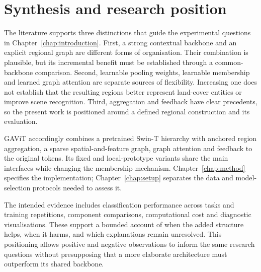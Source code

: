 \section{Synthesis and research position}

The literature supports three distinctions that guide the experimental
questions in Chapter~\ref{chap:introduction}. First, a strong contextual
backbone and an explicit regional graph are different forms of organisation.
Their combination is plausible, but its incremental benefit must be
established through a common-backbone comparison. Second, learnable pooling
weights, learnable membership and learned graph attention are separate
sources of flexibility. Increasing one does not establish that the resulting
regions better represent land-cover entities or improve scene recognition.
Third, aggregation and feedback have clear precedents, so the present work
is positioned around a defined regional construction and its evaluation.

GAViT accordingly combines a pretrained Swin-T hierarchy with anchored region
aggregation, a sparse spatial-and-feature graph, graph attention and feedback
to the original tokens. Its fixed and local-prototype variants share the
main interfaces while changing the membership mechanism. Chapter~\ref{chap:method}
specifies the implementation; Chapter~\ref{chap:setup} separates the data
and model-selection protocols needed to assess it.

The intended evidence includes classification performance across tasks and
training repetitions, component comparisons, computational cost and
diagnostic visualisations. These support a bounded account of when the
added structure helps, when it harms, and which explanations remain
unresolved. This positioning allows positive and negative observations to
inform the same research questions without presupposing that a more
elaborate architecture must outperform its shared backbone.
